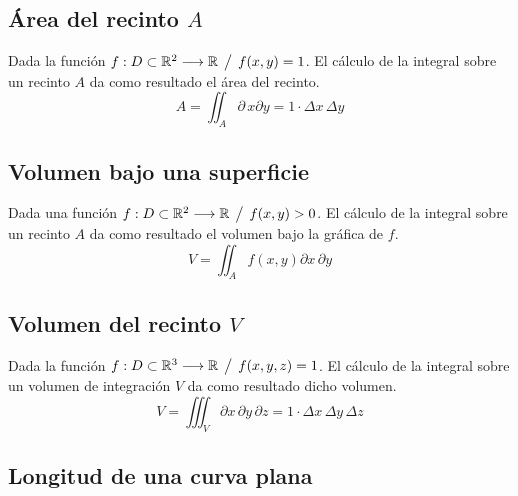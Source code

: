 \begin{center}
    \def\svgwidth{0.6\linewidth}
    
\end{center}


\subsection{Área del recinto $A$}

Dada la función $f:D \subset \mathbb{R}^2 \longrightarrow \mathbb{R} \hspace{1ex} \big/ \hspace{1ex} f(x,y)=1$.
El cálculo de la integral sobre un recinto $A$ da como resultado el área del recinto.
\begin{equation*}
    A = \iint_A \partial \, x \partial y = 1 \cdot \Delta x \, \Delta y
\end{equation*}

\begin{center}
    \def\svgwidth{0.6\linewidth}
    
\end{center}


\subsection{Volumen bajo una superficie}

Dada una función $f:D \subset \mathbb{R}^2 \longrightarrow \mathbb{R} \hspace{1ex} \big/ \hspace{1ex} f(x,y)>0$.
El cálculo de la integral sobre un recinto $A$ da como resultado el volumen bajo la gráfica de $f$.
\begin{equation*}
    V = \iint_A f(x,y) \partial x \, \partial y
\end{equation*}

\begin{center}
    \def\svgwidth{0.6\linewidth}
    
\end{center}


\subsection{Volumen del recinto $V$}

Dada la función $f:D \subset \mathbb{R}^3 \longrightarrow \mathbb{R} \hspace{1ex} \big/ \hspace{1ex} f(x,y,z)=1$.
El cálculo de la integral sobre un volumen de integración $V$ da como resultado dicho volumen.
\begin{equation*}
    V = \iiint_V \partial x \, \partial y \, \partial z = 1 \cdot \Delta x \, \Delta y \, \Delta z
\end{equation*}


\subsection{Longitud de una curva plana}

